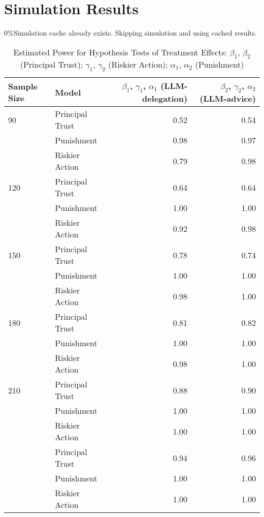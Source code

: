 \documentclass[
]{article}
\begin{document}
\section{Simulation Results}\label{simulation-results}

\textbar{} \textbar{} \textbar{} 0\%Simulation cache already exists.
Skipping simulation and using cached results.

\begin{table}[!h]

\caption{\label{tab:plot_power}Estimated Power for Hypothesis Tests of Treatment Effects: $\beta_1$, $\beta_2$ (Principal Trust); $\gamma_1$, $\gamma_2$ (Riskier Action); $\alpha_1$, $\alpha_2$ (Punishment)}
\centering
\fontsize{10}{12}\selectfont
\begin{tabular}{llrr}
\toprule
Sample Size & Model & $\beta_1$, $\gamma_1$, $\alpha_1$ (LLM-delegation) & $\beta_2$, $\gamma_2$, $\alpha_2$ (LLM-advice)\\
[1.5ex]
\midrule
90 & Principal Trust & 0.52 & 0.54\\
[1.5ex]
 & Punishment & 0.98 & 0.97\\
[1.5ex]
 & Riskier Action & 0.79 & 0.98\\
[1.5ex]
120 & Principal Trust & 0.64 & 0.64\\
[1.5ex]
 & Punishment & 1.00 & \vphantom{4} 1.00\\
[1.5ex]
\addlinespace
 & Riskier Action & 0.92 & 0.98\\
[1.5ex]
150 & Principal Trust & 0.78 & 0.74\\
[1.5ex]
 & Punishment & 1.00 & \vphantom{3} 1.00\\
[1.5ex]
 & Riskier Action & 0.98 & \vphantom{1} 1.00\\
[1.5ex]
180 & Principal Trust & 0.81 & 0.82\\
[1.5ex]
\addlinespace
 & Punishment & 1.00 & \vphantom{2} 1.00\\
[1.5ex]
 & Riskier Action & 0.98 & 1.00\\
[1.5ex]
210 & Principal Trust & 0.88 & 0.90\\
[1.5ex]
 & Punishment & 1.00 & \vphantom{1} 1.00\\
[1.5ex]
 & Riskier Action & 1.00 & \vphantom{1} 1.00\\
[1.5ex]
\addlinespace
240 & Principal Trust & 0.94 & 0.96\\
[1.5ex]
 & Punishment & 1.00 & 1.00\\
[1.5ex]
 & Riskier Action & 1.00 & 1.00\\
[1.5ex]
\bottomrule
\end{tabular}
\end{table}
\end{document}
